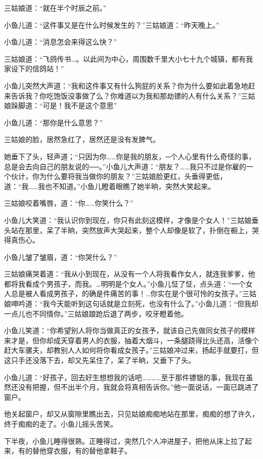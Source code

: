 \documentclass[12pt,oneside]{book}
\begin{document}
三姑娘道：``就在半个时辰之前。''

小鱼儿道：``这件事又是在什么时候发生的？''三姑娘道：``昨天晚上。''

小鱼儿道：``消息怎会来得这么快？''

三姑娘道：``飞鸽传书\ldots。以此间为中心，周围数千里大小七十九个城镇，都有我家设下的信鸽站！''

小鱼儿突然大声道：``我和这件事又有什么狗屁的关系？你为什么要如此着急地赶来告诉我？你吃饱饭没事做了么？你难道以为我和那劫镖的人有什么关系？''三姑娘跺脚道：``可是！我不是这个意思''

小鱼儿道：``那你是什么意思？''

三姑娘的脸，居然急红了，居然还是没有发脾气。

她垂下了头，轻声道；``只因为你\ldots\ldots 你是我的朋友，─个人心里有什么奇怪的事，总是会去向自己的朋友说的──。''小鱼儿大声道：``朋友？\ldots\ldots 我只不过是你雇的一个伙计，你为什么要将我当做你的朋友？''三姑娘脸更红，头垂得更低，道：``我\ldots\ldots 我也不知道。''小鱼儿瞪着眼瞧了她半晌，突然大笑起来。

三姑娘咬着嘴唇，道：``你\ldots\ldots 你笑什么？''

小鱼儿大笑道：``我认识你到现在，你只有此刻这模样，才像是个女人！''三姑娘垂头站在那里，呆了半晌，突然放声大哭起来，整个人却像是软了，扑倒在橱上，哭得真伤心。

小鱼儿皱了皱眉，道：``你哭什么？''

三姑娘痛哭着道：``我从小到现在，从没有一个人将我看作女人，就连我爹爹，他都将我看成个男孩子，而我。\ldots 明明是个女人。''小鱼儿怔了怔，点头道：``一个女人总是被人看成男孩子，的确是件痛苦的事！\ldots 你实在是个很可怜的女孩子。''三姑娘呻吟道：``我今天能听到这句话就是立刻死，也没有什么了。''小鱼儿道：``但我却一点儿也不同情你。''三姑娘踉跄后退了两步，咬牙瞪着他。

小鱼儿笑道：``你希望别人将你当做真正的女孩予，就该自己先做同女孩子的模样来才是，但你却成天穿着男人的衣服，抽着大烟斗，一条腿跷得比头还高，活像个赶大车骡夫，却教别人人如何将你看成女孩子。''三姑娘冲过来，扬起手就要打，但这只手还没落下去，却又先呆住了，呆了半晌，又垂下了头。

小鱼儿道：``好孩子，回去好生想想我的话吧\ldots\ldots\ldots\ldots 至于那件镖银的事，我现在虽然还没有把握，但不出半个月，我就会将真相告诉你。''他一面说话，一面已跳进了窗户。

他关起窗户，却又从窗隙里瞧出去，只见姑娘痴痴地站在那里，痴痴的想了许久，终于痴痴的走了。小鱼儿摇头苦笑。

下半夜，小鱼儿睡得很熟。正睡得过，突然几个人冲进屋子，把他从床上拉了起来，有的替他穿衣服，有的替他拿鞋子。
\end{document}
